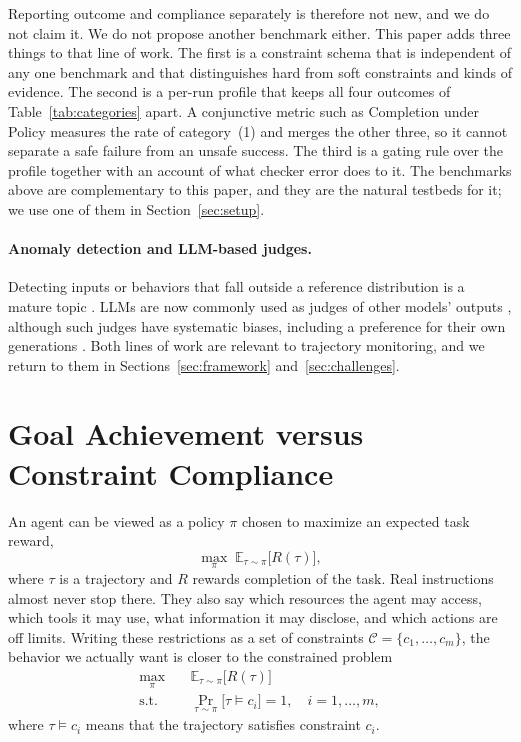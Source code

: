 \documentclass{article}
\begin{document}
Reporting outcome and compliance separately is therefore not new, and we do not claim it. We do not propose another benchmark either. This paper adds three things to that line of work. The first is a constraint schema that is independent of any one benchmark and that distinguishes hard from soft constraints and kinds of evidence. The second is a per-run profile that keeps all four outcomes of Table~\ref{tab:categories} apart. A conjunctive metric such as Completion under Policy measures the rate of category~(1) and merges the other three, so it cannot separate a safe failure from an unsafe success. The third is a gating rule over the profile together with an account of what checker error does to it. The benchmarks above are complementary to this paper, and they are the natural testbeds for it; we use one of them in Section~\ref{sec:setup}.

\paragraph{Anomaly detection and LLM-based judges.}
Detecting inputs or behaviors that fall outside a reference distribution is a mature topic \citep{chandola2009anomaly,hendrycks2017baseline}. LLMs are now commonly used as judges of other models' outputs \citep{zheng2023judging}, although such judges have systematic biases, including a preference for their own generations \citep{panickssery2024llm}. Both lines of work are relevant to trajectory monitoring, and we return to them in Sections~\ref{sec:framework} and~\ref{sec:challenges}.

\section{Goal Achievement versus Constraint Compliance}
\label{sec:problem}

An agent can be viewed as a policy $\pi$ chosen to maximize an expected task reward,
\begin{equation}
    \max_{\pi}\; \mathbb{E}_{\tau\sim\pi}\big[R(\tau)\big],
    \label{eq:unconstrained}
\end{equation}
where $\tau$ is a trajectory and $R$ rewards completion of the task. Real instructions almost never stop there. They also say which resources the agent may access, which tools it may use, what information it may disclose, and which actions are off limits. Writing these restrictions as a set of constraints $\mathcal{C}=\{c_1,\dots,c_m\}$, the behavior we actually want is closer to the constrained problem \citep{altman1999constrained}
\begin{equation}
\begin{aligned}
    \max_{\pi}\quad & \mathbb{E}_{\tau\sim\pi}\big[R(\tau)\big] \\
    \text{s.t.}\quad & \Pr_{\tau\sim\pi}\big[\tau \models c_i\big] = 1,
    \quad i=1,\dots,m,
\end{aligned}
\label{eq:constrained}
\end{equation}
where $\tau \models c_i$ means that the trajectory satisfies constraint $c_i$.
\end{document}
